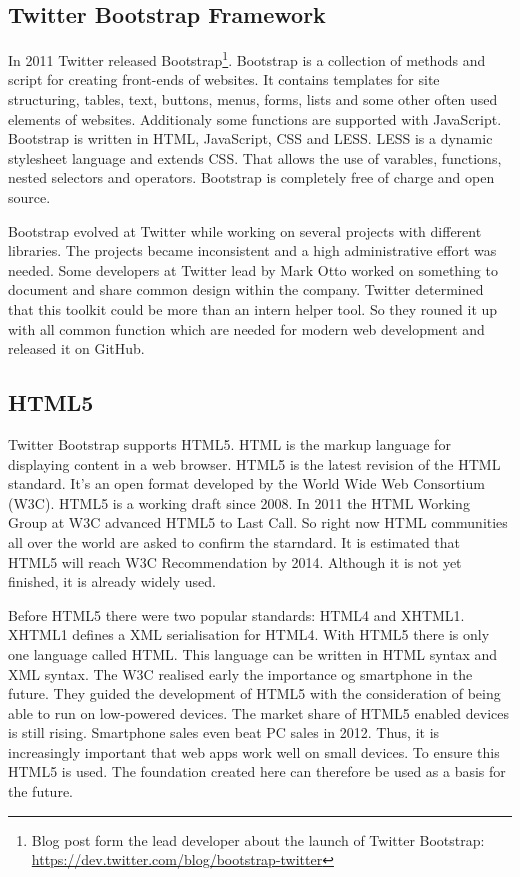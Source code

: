 \subsection{Twitter Bootstrap Framework}
In 2011 Twitter released Bootstrap\footnote{Blog post form the lead developer about the launch of Twitter Bootstrap: \url{https://dev.twitter.com/blog/bootstrap-twitter}}. Bootstrap is a collection of methods and script for creating front-ends of websites. It contains templates for site structuring, tables, text, buttons, menus, forms, lists and some other often used elements of websites. Additionaly some functions are supported with JavaScript. Bootstrap is written in HTML, JavaScript, CSS and LESS. LESS is a dynamic stylesheet language and extends CSS. That allows the use of varables, functions, nested selectors and operators.\cite{less} Bootstrap is completely free of charge and open source. \cite{bootstrap}

Bootstrap evolved at Twitter while working on several projects with different libraries. The projects became inconsistent and a high administrative effort was needed. Some developers at Twitter lead by Mark Otto worked on something to document and share common design within the company. Twitter determined that this toolkit could be more than an intern helper tool. So they rouned it up with all common function which are needed for modern web development and released it on GitHub. \cite{markotto}

\subsection{HTML5}
Twitter Bootstrap supports HTML5. HTML is the markup language for displaying content in a web browser. HTML5 is the latest revision of the HTML standard. It's an open format developed by the World Wide Web Consortium (W3C). HTML5 is a working draft since 2008. In 2011 the HTML Working Group at W3C advanced HTML5 to Last Call. So right now HTML communities all over the world are asked to confirm the starndard.  It is estimated that HTML5 will reach W3C Recommendation by 2014.\cite{html:lastcall} Although it is not yet finished, it is already widely used.

Before HTML5  there were two popular standards: HTML4 and XHTML1. XHTML1 defines a XML serialisation for HTML4. With HTML5 there is only one language called HTML. This language can be written in HTML syntax and XML syntax. 
\cite{html:5differences} The W3C realised early the importance og smartphone in the future. They guided the development of HTML5 with the consideration of being able to run on low-powered devices. The market share of HTML5 enabled devices is still rising. \cite{smartphonesales} Smartphone sales even beat PC sales in 2012. Thus, it is increasingly important that web apps work well on small devices. To ensure this HTML5 is used. The foundation created here can therefore be used as a basis for the future.

